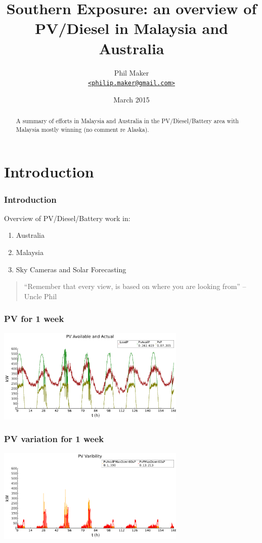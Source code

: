 \documentclass{beamer}
\title{Southern Exposure: an overview of PV/Diesel in Malaysia and
  Australia}
\author{Phil Maker\\
  \href{mailto:philip.maker@gmail.com}{\texttt{<philip.maker@gmail.com>}}
}
\institute{Alaskan Center for Energy and Power}
\date{March 2015}
\begin{document}
\begin{frame}
  \maketitle
  \vspace{-0.6cm}
  \begin{abstract}
    \small A summary of efforts in Malaysia and Australia in the
    PV/Diesel/Battery area with Malaysia mostly winning (no comment re Alaska).
  \end{abstract}
\end{frame}

\section{Introduction}
\begin{frame}\frametitle{Introduction}
Overview of PV/Diesel/Battery work in:
 
  \begin{enumerate}
  \item Australia
  \item Malaysia
  \item Sky Cameras and Solar Forecasting
  \end{enumerate}

\pause
\vfill
\begin{quote}
``Remember that every view,
\pause
is based on where you are looking from'' -- Uncle Phil
\end{quote}

\end{frame}

\begin{frame}\frametitle{PV for 1 week}
\includegraphics[width=9cm]{figPv1.pdf}  
\end{frame}

\begin{frame}\frametitle{PV variation for 1 week}
\includegraphics[width=9cm]{figPv2.pdf}  
\end{frame}
\end{document}
